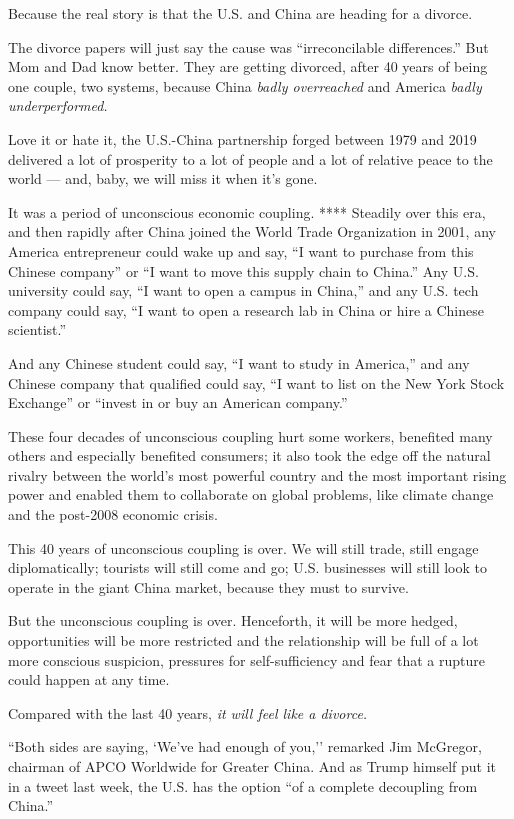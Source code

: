 Because the real story is that the U.S. and China are heading for a
divorce.

The divorce papers will just say the cause was ``irreconcilable
differences.'' But Mom and Dad know better. They are getting divorced,
after 40 years of being one couple, two systems, because China
\emph{badly overreached} and America \emph{badly underperformed.}

Love it or hate it, the U.S.-China partnership forged between 1979 and
2019 delivered a lot of prosperity to a lot of people and a lot of
relative peace to the world --- and, baby, we will miss it when it's
gone.

It was a period of unconscious economic coupling. **** Steadily over
this era, and then rapidly after China joined the World Trade
Organization in 2001, any America entrepreneur could wake up and say,
``I want to purchase from this Chinese company'' or ``I want to move
this supply chain to China.'' Any U.S. university could say, ``I want to
open a campus in China,'' and any U.S. tech company could say, ``I want
to open a research lab in China or hire a Chinese scientist.''

And any Chinese student could say, ``I want to study in America,'' and
any Chinese company that qualified could say, ``I want to list on the
New York Stock Exchange'' or ``invest in or buy an American company.''

These four decades of unconscious coupling hurt some workers, benefited
many others and especially benefited consumers; it also took the edge
off the natural rivalry between the world's most powerful country and
the most important rising power and enabled them to collaborate on
global problems, like climate change and the post-2008 economic crisis.

This 40 years of unconscious coupling is over. We will still trade,
still engage diplomatically; tourists will still come and go; U.S.
businesses will still look to operate in the giant China market, because
they must to survive.

But the unconscious coupling is over. Henceforth, it will be more
hedged, opportunities will be more restricted and the relationship will
be full of a lot more conscious suspicion, pressures for
self-sufficiency and fear that a rupture could happen at any time.

Compared with the last 40 years, \emph{it will feel like a divorce.}

``Both sides are saying, `We've had enough of you,'' remarked Jim
McGregor, chairman of APCO Worldwide for Greater China. And as Trump
himself put it in a tweet last week, the U.S. has the option ``of a
complete decoupling from China.''

